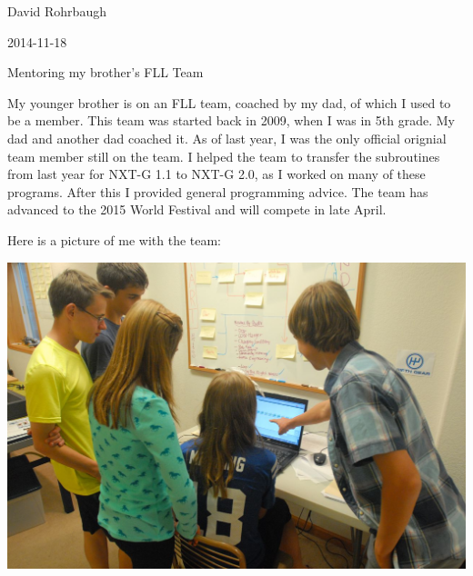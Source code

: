 David Rohrbaugh

2014-11-18

Mentoring my brother's FLL Team

\medskip

My younger brother is on an FLL team, coached by my dad, of which I used to be a member. This team was started back in 2009, when I was in 5th grade. My dad and another dad coached it. As of last year, I was the only official orignial team member still on the team. I helped the team to transfer the subroutines from last year for NXT-G 1.1 to NXT-G 2.0, as I worked on many of these programs. After this I provided general programming advice. The team has advanced to the 2015 World Festival and will compete in late April.

\medskip

Here is a picture of me with the team:

\begin{center}
 \includegraphics[width=\textwidth]{./Entries/Images/mentoring.jpg}
\end{center}
